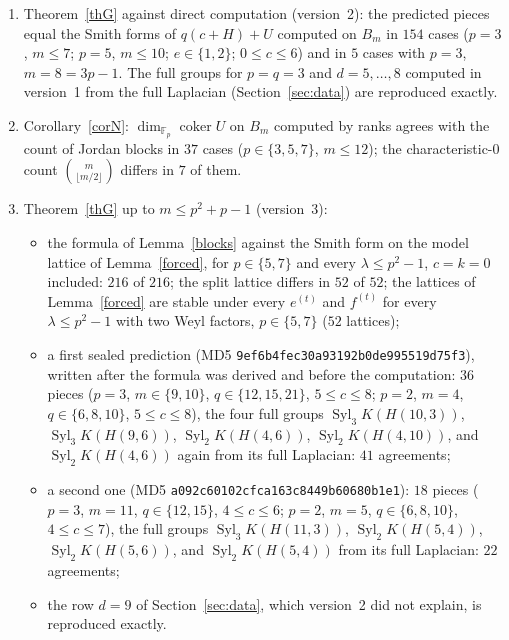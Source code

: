 \documentclass[10pt]{article}
\theoremstyle{ds}
\theoremstyle{dsrem}
\newcommand{\F}{\mathbb{F}}
\newcommand{\Syl}{\operatorname{Syl}}
\newcommand{\coker}{\operatorname{coker}}
\begin{document}
\begin{enumerate}
\begin{itemize}
\item removing the glue (the split lattice) changes the answer in $293$ of $293$ cases, and the formula of Theorem~\ref{glue} applied beyond $2p-2$ fails in $12$ of $18$ pieces.
\end{itemize}
\item Theorem~\ref{thG} against direct computation (version~2): the predicted pieces equal the Smith forms of $q(c+H)+U$ computed on $B_m$ in $154$ cases ($p=3$, $m\le7$; $p=5$, $m\le10$; $e\in\{1,2\}$; $0\le c\le6$) and in $5$ cases with $p=3$, $m=8=3p-1$. The full groups for $p=q=3$ and $d=5,\dots,8$ computed in version~1 from the full Laplacian (Section~\ref{sec:data}) are reproduced exactly.
\item Corollary~\ref{corN}: $\dim_{\F_p}\coker U$ on $B_m$ computed by ranks agrees with the count of Jordan blocks in $37$ cases ($p\in\{3,5,7\}$, $m\le12$); the characteristic-$0$ count $\binom m{\lfloor m/2\rfloor}$ differs in $7$ of them.
\item Theorem~\ref{thG} up to $m\le p^2+p-1$ (version~3):
\begin{itemize}
\item the formula of Lemma~\ref{blocks} against the Smith form on the model lattice of Lemma~\ref{forced}, for $p\in\{5,7\}$ and every $\lambda\le p^2-1$, $c=k=0$ included: $216$ of $216$; the split lattice differs in $52$ of $52$; the lattices of Lemma~\ref{forced} are stable under every $e^{(t)}$ and $f^{(t)}$ for every $\lambda\le p^2-1$ with two Weyl factors, $p\in\{5,7\}$ ($52$ lattices);
\item a first sealed prediction (MD5 \texttt{9ef6b4fe\allowbreak c30a9319\allowbreak 2b0de995\allowbreak 519d75f3}), written after the formula was derived and before the computation: $36$ pieces ($p=3$, $m\in\{9,10\}$, $q\in\{12,15,21\}$, $5\le c\le8$; $p=2$, $m=4$, $q\in\{6,8,10\}$, $5\le c\le8$), the four full groups $\Syl_3K(H(10,3))$, $\Syl_3K(H(9,6))$, $\Syl_2K(H(4,6))$, $\Syl_2K(H(4,10))$, and $\Syl_2K(H(4,6))$ again from its full Laplacian: $41$ agreements;
\item a second one (MD5 \texttt{a092c601\allowbreak 02cfca16\allowbreak 3c8449b6\allowbreak 0680b1e1}): $18$ pieces ($p=3$, $m=11$, $q\in\{12,15\}$, $4\le c\le6$; $p=2$, $m=5$, $q\in\{6,8,10\}$, $4\le c\le7$), the full groups $\Syl_3K(H(11,3))$, $\Syl_2K(H(5,4))$, $\Syl_2K(H(5,6))$, and $\Syl_2K(H(5,4))$ from its full Laplacian: $22$ agreements;
\item the row $d=9$ of Section~\ref{sec:data}, which version~2 did not explain, is reproduced exactly.

\end{itemize}
\end{enumerate}
\end{document}
